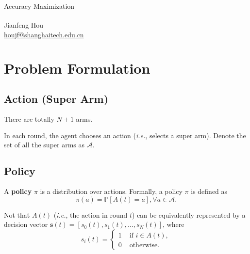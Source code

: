 \documentclass[12pt, a4paper]{article}
\begin{document}
\begin{center}
    \vspace*{2cm}
    {\textcolor{MyTitleColor}{
            \fontsize{40}{48}\philosopher\selectfont
            Accuracy Maximization}}\\[\baselineskip]
    \vspace*{1cm}
    {\fontsize{20}{24}\barlow{}}\\[\baselineskip]
    \vspace*{3cm}
    {\fontsize{16}{19.2}\selectfont Jianfeng Hou}\\[\baselineskip]
    {\fontsize{16}{19.2}\selectfont\hypersetup{linkcolor=black, urlcolor=black} \href{mailto:houjf@shanghaitech.edu.cn}{houjf@shanghaitech.edu.cn}}\\[\baselineskip]
    \vfill
\end{center}

\thispagestyle{empty}

\newpage


\section{Problem Formulation}

\subsection{Action (Super Arm)}

There are totally $N + 1$ arms.

In each round, the agent chooses an action (\textit{i.e.}, selects a super arm). Denote the set of all the super arms as $\mathcal{A}$.

\subsection{Policy}

A \textbf{policy} $\pi$ is a distribution over actions. Formally, a policy $\pi$ is defined as
\[
\pi (a) = \mathbb{P} \left[ A(t) = a \right], \forall a \in \mathcal{A}.
\]

Not that $ A(t)$ (\textit{i.e.}, the action in round $t$) can be equivalently represented by a decision vector $\bm{s} (t) = [ s_0 (t), s_1 (t), \dots, s_N (t) ]$, where
\[
s_i (t) = 
\begin{cases}
	1 &\text{ if } i \in A(t),\\
	0 &\text{ otherwise.}
\end{cases}
\]
\end{document}
